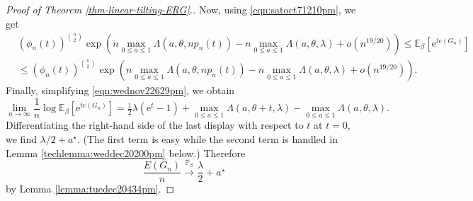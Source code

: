 \documentclass[bj,authoryear,noshowframe]{imsart}
\numberwithin{equation}{section}
\theoremstyle{plain}
\theoremstyle{definition}
\newcommand{\sss}{\scriptscriptstyle}
\newcommand{\e}{{\mathrm e}}
\newcommand {\convpbeta}{\stackrel{\sss {\mathbb P}_{\beta}}{\longrightarrow}}
\begin{document}
\begin{proof}[Proof of Theorem \ref{thm-linear-tilting-ERG}.]
Now, using \eqref{eqn:satoct71210pm}, we get 
\begin{equation}
\label{eqn:wednov22629pm}
\begin{aligned}
&\left(\phi_n(t)\right)^{{n\choose 2}} \exp{\left(n\max_{0 \leq a \leq 1} \Lambda(a,\theta,np_n(t)) 
- n\max_{0 \leq a \leq 1} \Lambda(a,\theta,\lambda) +o(n^{19/20})\right)} \leq \mathbb{E}_\beta\left[\e^{te(G_n)}\right] \\
&\leq \left(\phi_n(t)\right)^{{n\choose 2}} \exp{\left(n\max_{0 \leq a \leq 1} \Lambda(a,\theta,np_n(t)) 
- n\max_{0 \leq a \leq 1} \Lambda(a,\theta,\lambda) +o(n^{19/20})\right)}.
\end{aligned}
\end{equation}
Finally, simplifying \eqref{eqn:wednov22629pm}, we obtain
$$
\lim_{n \rightarrow \infty} \frac{1}{n} \log{\mathbb{E}_\beta\left[\e^{te(G_n)}\right]} = \tfrac{1}{2}\lambda (\e^t-1) 
+ \max_{0 \leq a \leq 1} \Lambda(a,\theta+t,\lambda)-\max_{0 \leq a \leq 1} \Lambda(a,\theta,\lambda).
$$
Differentiating the right-hand side of the last display with respect to $t$ at $t=0$, we find $\lambda/2+a^{\star}$. (The first term is easy while the second term is handled in Lemma \ref{techlemma:weddec20200pm} below.) Therefore 
$$
\frac{E(G_n)}{n}\convpbeta \frac{\lambda}{2}+a^{\star}
$$ 
by Lemma \ref{lemma:tuedec20434pm}.
\end{proof}

\end{document}
